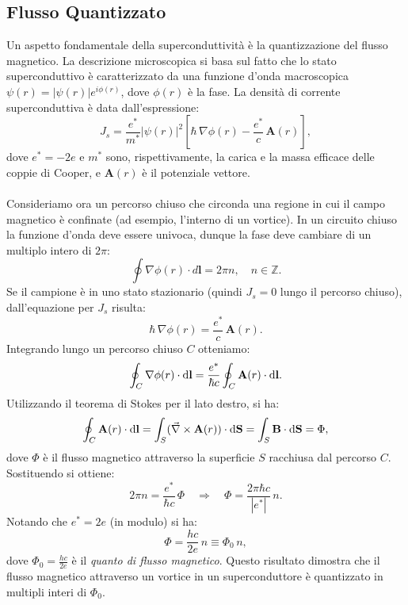 \subsection{Flusso Quantizzato}
Un aspetto fondamentale della superconduttività è la quantizzazione del flusso magnetico. La descrizione microscopica si basa sul fatto che lo stato superconduttivo è caratterizzato da una funzione d'onda macroscopica \(\psi(r) = |\psi(r)| e^{i\phi(r)}\), dove \(\phi(r)\) è la fase. La densità di corrente superconduttiva è data dall'espressione:
\[
J_s = \frac{e^*}{m^*} |\psi(r)|^2 \left[ \hbar\, \nabla\phi(r) - \frac{e^*}{c}\, \mathbf{A}(r) \right],
\]
dove \(e^* = -2e\) e \(m^*\) sono, rispettivamente, la carica e la massa efficace delle coppie di Cooper, e \(\mathbf{A}(r)\) è il potenziale vettore.\\\\
Consideriamo ora un percorso chiuso che circonda una regione in cui il campo magnetico è confinate (ad esempio, l'interno di un vortice). In un circuito chiuso la funzione d'onda deve essere univoca, dunque la fase deve cambiare di un multiplo intero di \(2\pi\):
\[
\oint \nabla\phi(r) \cdot d\mathbf{l} = 2\pi n,\quad n\in\mathbb{Z}.
\]
Se il campione è in uno stato stazionario (quindi \(J_s = 0\) lungo il percorso chiuso), dall'equazione per \(J_s\) risulta:
\[
\hbar\, \nabla\phi(r) = \frac{e^*}{c}\, \mathbf{A}(r).
\]
Integrando lungo un percorso chiuso \(C\) otteniamo:
\[
\oint_C \nabla\phi(r) \cdot \text{d}\mathbf{l} = \frac{e^*}{\hbar c} \oint_C \mathbf{A}(r) \cdot \text{d}\mathbf{l}.
\]
Utilizzando il teorema di Stokes per il lato destro, si ha:
\[
\oint_C \mathbf{A}(r) \cdot \text{d}\mathbf{l} = \int_S (\vec{\nabla} \times \mathbf{A}(r)) \cdot \text{d}\mathbf{S} = \int_S \mathbf{B} \cdot \text{d}\mathbf{S} = \Phi,
\]
dove \(\Phi\) è il flusso magnetico attraverso la superficie \(S\) racchiusa dal percorso \(C\).\\
Sostituendo si ottiene:
\[
2\pi n = \frac{e^*}{\hbar c}\, \Phi \quad \Longrightarrow \quad \Phi = \frac{2\pi \hbar c}{|e^*|}\, n.
\]
Notando che \(e^* = 2e\) (in modulo) si ha:
\[
\Phi = \frac{h c}{2e}\, n \equiv \Phi_0\, n,
\]
dove \(\Phi_0 = \frac{hc}{2e}\) è il \emph{quanto di flusso magnetico}. Questo risultato dimostra che il flusso magnetico attraverso un vortice in un superconduttore è quantizzato in multipli interi di \(\Phi_0\).


